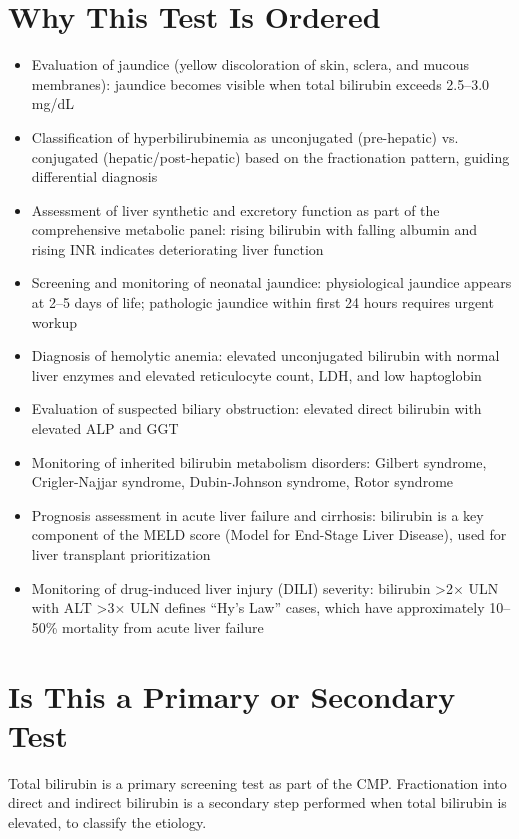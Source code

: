 \section*{Why This Test Is Ordered}
\begin{itemize}
  \item Evaluation of jaundice (yellow discoloration of skin, sclera, and mucous membranes): jaundice becomes visible when total bilirubin exceeds 2.5--3.0 mg/dL
  \item Classification of hyperbilirubinemia as unconjugated (pre-hepatic) vs. conjugated (hepatic/post-hepatic) based on the fractionation pattern, guiding differential diagnosis
  \item Assessment of liver synthetic and excretory function as part of the comprehensive metabolic panel: rising bilirubin with falling albumin and rising INR indicates deteriorating liver function
  \item Screening and monitoring of neonatal jaundice: physiological jaundice appears at 2--5 days of life; pathologic jaundice within first 24 hours requires urgent workup
  \item Diagnosis of hemolytic anemia: elevated unconjugated bilirubin with normal liver enzymes and elevated reticulocyte count, LDH, and low haptoglobin
  \item Evaluation of suspected biliary obstruction: elevated direct bilirubin with elevated ALP and GGT
  \item Monitoring of inherited bilirubin metabolism disorders: Gilbert syndrome, Crigler-Najjar syndrome, Dubin-Johnson syndrome, Rotor syndrome
  \item Prognosis assessment in acute liver failure and cirrhosis: bilirubin is a key component of the MELD score (Model for End-Stage Liver Disease), used for liver transplant prioritization
  \item Monitoring of drug-induced liver injury (DILI) severity: bilirubin >2$\times$ ULN with ALT >3$\times$ ULN defines ``Hy's Law'' cases, which have approximately 10--50\% mortality from acute liver failure
\end{itemize}

\section*{Is This a Primary or Secondary Test}
Total bilirubin is a primary screening test as part of the CMP. Fractionation into direct and indirect bilirubin is a secondary step performed when total bilirubin is elevated, to classify the etiology.

